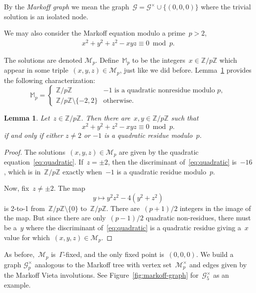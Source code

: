 \documentclass{article}
\newtheorem{lemma}{Lemma}
\theoremstyle{definition}
\theoremstyle{remark}
\begin{document}
By the \textit{Markoff graph} we mean the graph~$\mathcal{G} = \mathcal{G}^\times \cup \{(0, 0, 0)\}$ where the trivial solution is an isolated node.

We may also consider the Markoff equation modulo a prime~$p > 2$,
\begin{align*}
    x^2 + y^2 + z^2 - xyz \equiv 0 \bmod p. \label{eq:markoff-mod-p}
\end{align*}

The solutions are denoted $\mathcal{M}_p$.
Define~$\mathbb{M}_p$ to be the integers~$x \in \mathbb{Z} / p\mathbb{Z}$ which appear in some triple~$(x, y, z) \in \mathcal{M}_p$, just like we did before.
Lemma~\ref{lem:mp} provides the following characterization:
\[ \mathbb{M}_p =
    \begin{cases}
        \mathbb{Z} / p\mathbb{Z} & -1 \text{\ is a quadratic nonresidue modulo } p,\\
        \mathbb{Z} / p\mathbb{Z} \setminus \{-2, 2\} & \text{otherwise}.
    \end{cases}
\]

\begin{lemma}\label{lem:mp}
    Let~$z \in \mathbb{Z} / p\mathbb{Z}$. 
    Then there are~$x, y \in \mathbb{Z} / p\mathbb{Z}$ such that
    \[ x^2 + y^2 + z^2 - xyz \equiv 0 \bmod p. \]
    if and only if either $z \neq 2$ or $-1$ is a quadratic residue modulo~$p$.
\end{lemma}
\begin{proof}
    The solutions~$(x, y, z) \in \mathcal{M}_p$ are given by the quadratic equation~\eqref{eq:quadratic}.
    If~$z = \pm 2$, then the discriminant of~\eqref{eq:quadratic} is~$-16$, which is in~$\mathbb{Z} / p\mathbb{Z}$ exactly when~$-1$ is a quadratic residue modulo~$p$.

    Now, fix~$z \neq \pm 2$.
    The map
    \[ y \mapsto y^2z^2 - 4(y^2 + z^2)\] 
    is 2-to-1 from~$\mathbb{Z} / p\mathbb{Z} \setminus \{0\}$ to~$\mathbb{Z} / p\mathbb{Z}$.
    There are~$(p + 1) / 2$ integers in the image of the map.
    But since there are only~$(p - 1) / 2$ quadratic non-residues, there must be a~$y$ where the discriminant of~\eqref{eq:quadratic} is a quadratic residue giving a~$x$ value for which~$(x, y, z) \in \mathcal{M}_p$.
\end{proof}

As before,~$\mathcal{M}_p$ is~$\Gamma$-fixed, and the only fixed point is~$(0, 0, 0)$.
We build a graph $\mathcal{G}_p^\times$ analogous to the Markoff tree with vertex set~$\mathcal{M}_p^\times$ and edges given by the Markoff Vieta involutions.
See Figure~\ref{fig:markoff-graph} for~$\mathcal{G}_5^\times$ as an example.
\end{document}
